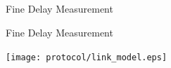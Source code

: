 \documentclass[compress,red]{beamer}
\begin{document}
\subsection{}
% 
% 
% 
\logo{}
\begin{frame}{Fine Delay Measurement}


\end{frame}
\begin{frame}{Fine Delay Measurement}

  \begin{center}
  \texttt{[image: protocol/link\_model.eps]}
  \end{center}

\end{frame}
\end{document}
